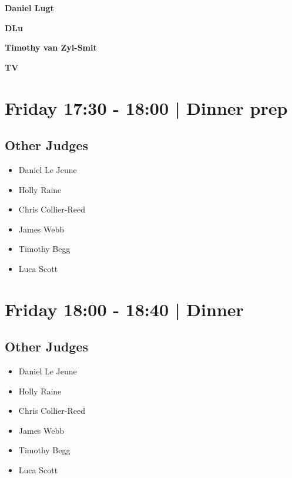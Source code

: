 \documentclass[10pt]{article}
\newcommand{\newtitle}[1]{\begin{center}{\Huge\bfseries #1 }\\ \vspace{5mm}\end{center}}
\newcommand{\newsubtitle}[1]{\begin{center}{\color{grey}\Large\bfseries #1 }\\ \vspace{5mm}\end{center}}
\begin{document}
    
	\clearpage

		\newtitle{Daniel Lugt}
	\newsubtitle{DLu}

    
	\clearpage

		\newtitle{Timothy van Zyl-Smit}
	\newsubtitle{TV}

            \section*{Friday 17:30
        -
        18:00
        |
         Dinner prep}
        
                
        \subsection*{Other Judges}
        
            \begin{itemize}
                            \item Daniel Le Jeune
                            \item Holly Raine
                            \item Chris Collier-Reed
                            \item James Webb
                            \item Timothy Begg
                            \item Luca Scott
                        \end{itemize}
        

            \section*{Friday 18:00
        -
        18:40
        |
         Dinner }
        
                
        \subsection*{Other Judges}
        
            \begin{itemize}
                            \item Daniel Le Jeune
                            \item Holly Raine
                            \item Chris Collier-Reed
                            \item James Webb
                            \item Timothy Begg
                            \item Luca Scott
                        \end{itemize}
        
\end{document}
